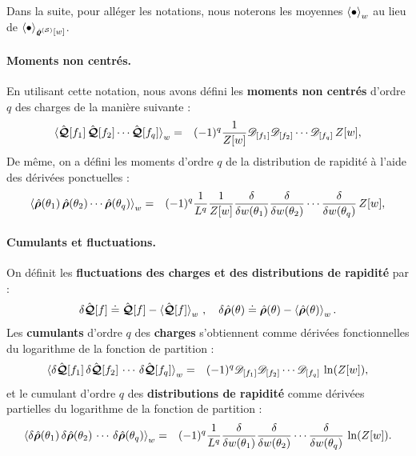 \medskip

Dans la suite, pour alléger les notations, nous noterons les moyennes $\braket{\bullet}_{w}$ au lieu de $\braket{\bullet}_{\hat{\bm{\varrho}}^{(\mathcal{S})}[w]}$.

\paragraph{Moments non centrés.}
En utilisant cette notation, nous avons défini les {\bf moments non centrés} d'ordre $q$ des charges de la manière suivante :
\begin{eqnarray}\label{chap4:eq.moment.charge.q.1}
	\braket{\hat{\bm{\mathcal{Q}}}[f_1] \,  \hat{\bm{\mathcal{Q}}}[f_2] \cdots \hat{\bm{\mathcal{Q}}}[f_q]}_w  & = & (-1)^q \frac{1}{Z[w]}\mathscr{D}_{[f_1]} \mathscr{D}_{[f_2]} \cdots \mathscr{D}_{[f_q]}\,  Z[w],
\end{eqnarray}
De même, on a défini les moments d’ordre $q$ de la distribution de rapidité à l’aide des dérivées ponctuelles :
\begin{eqnarray}\label{chap4:eq.moment.distr.q.1}
	\braket{\hat{\bm{\rho}}(\theta_1) \,  \hat{\bm{\rho}}(\theta_2) \cdots \hat{\bm{\rho}}(\theta_q)}_w  & = & (-1)^q \frac{1}{L^q}\frac{1}{Z[w]}\frac{\delta}{\delta w(\theta_1)} \frac{\delta}{\delta w(\theta_2)} \cdots \frac{\delta}{\delta w(\theta_q)}\,  Z[w],
\end{eqnarray}

\paragraph{Cumulants et fluctuations.}
On définit les {\bf fluctuations des charges et des distributions de rapidité} par :
\begin{eqnarray}
	\delta \hat{\bm{\mathcal{Q}}}[f]	 \doteq \hat{\bm{\mathcal{Q}}}[f] - \braket{\hat{\bm{\mathcal{Q}}}[f]}_w \, ,  \quad \delta \hat{\bm{\rho}}(\theta)	 \doteq \hat{\bm{\rho}}(\theta) - \braket{\hat{\bm{\rho}}(\theta)}_w.
\end{eqnarray}
Les {\bf cumulants} d’ordre $q$ des {\bf charges} s’obtiennent comme dérivées fonctionnelles du logarithme de la fonction de partition :
\begin{eqnarray}\label{chap4:eq.cumulant.charge.q.1}
	\braket{\delta\hat{\bm{\mathcal{Q}}}[f_1] \, \delta\hat{\bm{\mathcal{Q}}}[f_2] \, \cdots \,  \delta\hat{\bm{\mathcal{Q}}}[f_q]}_w  & = & (-1)^q \mathscr{D}_{[f_1]} \mathscr{D}_{[f_2]} \cdots \mathscr{D}_{[f_q]}\,  \ln(Z[w]),
\end{eqnarray}
et le cumulant d'ordre $q$ des {\bf distributions de rapidité} comme dérivées partielles du logarithme de la fonction de partition : 
\begin{eqnarray}\label{chap4:eq.cumulant.distr.q.1}
	\braket{\delta \hat{\bm{\rho}}(\theta_1) \, \delta\hat{\bm{\rho}}(\theta_2) \, \cdots \,  \delta\hat{\bm{\rho}}(\theta_q)}_w  & = & (-1)^q \frac{1}{L^q} \frac{\delta}{\delta w(\theta_1)} \frac{\delta}{\delta w(\theta_2)} \cdots \frac{\delta}{\delta w(\theta_q)}\,  \ln (Z[w]).
\end{eqnarray}

